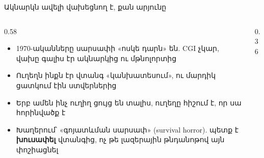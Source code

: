 \begin{frame}{Ակնարկն ավելի վախեցնող է, քան արյունը}
  \begin{columns}[c]
    \begin{column}{0.58\textwidth}
      \begin{itemize}
        \item 1970-ականները սարսափի «ոսկե դարն» են. CGI չկար, վախը գալիս էր ակնարկից ու մթնոլորտից
        \item<2-> Ուղեղն ինքն էր վտանգ «կանխատեսում», ու մարդիկ ցատկում էին ստվերներից
        \item<3-> Երբ ամեն ինչ ուղիղ ցույց են տալիս, ուղեղը հիշում է, որ սա հորինվածք է
        \item<4-> Խաղերում՝ «գոյատևման սարսափ» (survival horror). պետք է \textbf{խուսափել} վտանգից, ոչ թե լազերային թնդանոթով այն փոշիացնել
      \end{itemize}
    \end{column}
    \begin{column}{0.36\textwidth}
      \centering{}
    \end{column}
  \end{columns}
\end{frame}

